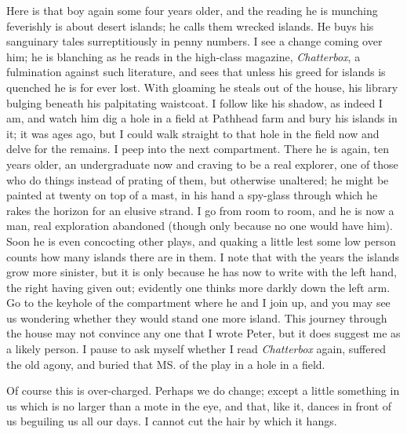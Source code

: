 Here is that boy again some four years older,
and the reading he is munching feverishly is about desert islands;
he calls them wrecked islands.
He buys his sanguinary tales surreptitiously in penny numbers.
I see a change coming over him;
he is blanching as he reads in the high-class magazine, \emph{Chatterbox},
a fulmination against such literature,
and sees that unless his greed for islands is quenched he is for ever lost.
With gloaming he steals out of the house, his library bulging beneath his palpitating waistcoat.
I follow like his shadow, as indeed I am,
and watch him dig a hole in a field at Pathhead farm and bury his islands in it;
it was ages ago, but I could walk straight to that hole in the field now and delve for the remains.
I peep into the next compartment.
There he is again, ten years older,
an undergraduate now and craving to be a real explorer,
one of those who do things instead of prating of them,
but otherwise unaltered;
he might be painted at twenty on top of a mast,
in his hand a spy-glass through which he rakes the horizon for an elusive strand.
I go from room to room,
and he is now a man, real exploration abandoned
(though only because no one would have him).
Soon he is even concocting other plays,
and quaking a little lest some low person counts how many islands there are in them.
I note that with the years the islands grow more sinister,
but it is only because he has now to write with the left hand, the right having given out;
evidently one thinks more darkly down the left arm.
Go to the keyhole of the compartment where he and I join up,
and you may see us wondering whether they would stand one more island.
This journey through the house may not convince any one that I wrote Peter,
but it does suggest me as a likely person.
I pause to ask myself whether I read \emph{Chatterbox} again, suffered the old agony,
and buried that MS. of the play in a hole in a field.

Of course this is over-charged.
Perhaps we do change;
except a little something in us which is no larger than a mote in the eye,
and that, like it, dances in front of us beguiling us all our days.
I cannot cut the hair by which it hangs.


